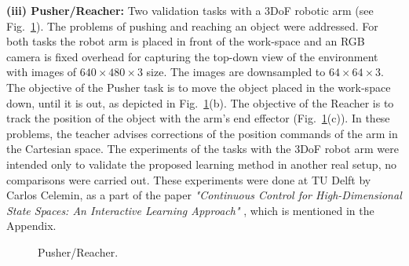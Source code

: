 \textbf{(iii) Pusher/Reacher:} Two validation tasks with a 3DoF robotic arm (see Fig.~\ref{fig:PusherReacher}). The problems of pushing  and reaching an object were addressed. For both tasks the robot arm is placed in front of the work-space and an RGB camera is fixed overhead for capturing the top-down view of the environment with images of $640\times480\times3$ size. The images are downsampled to $64\times64\times3$. The objective of the Pusher task is to move the object placed in the work-space down, until it is out, as depicted in Fig.~\ref{fig:PusherReacher}(b). The objective of the Reacher is to track the position of the object with the arm's end effector (Fig.~\ref{fig:PusherReacher}(c)). In these problems, the teacher advises corrections of the position commands of the arm in the Cartesian space. The experiments of the tasks with the 3DoF robot arm were intended only to validate the proposed learning method in another real setup, no comparisons were carried out. These experiments were done at TU Delft by Carlos Celemin, as a part of the paper \emph{"Continuous Control for High-Dimensional State Spaces: An Interactive Learning Approach"} \cite{perez2019continuous}, which is mentioned in the Appendix.

\begin{figure}[h]
\centering
{} 
\hspace{0.25cm}
\hspace{0.25cm}
\hspace{0.25cm}
\caption{Pusher/Reacher.} 
\label{fig:PusherReacher} 
\end{figure}

